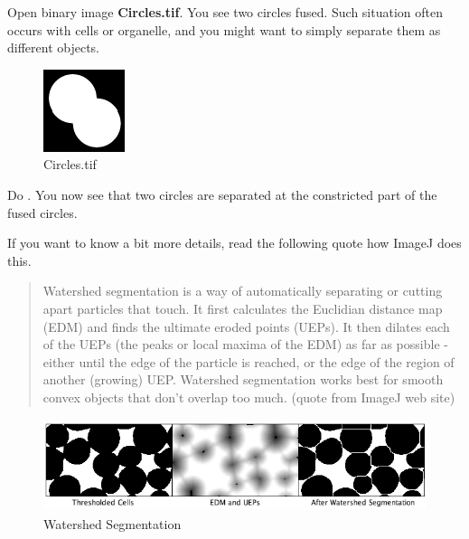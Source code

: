 \begin{indentexercise}{1}
Open binary image \textbf{Circles.tif}. You
see two circles fused. Such situation often occurs with cells or
organelle, and you might want to simply separate them as different
objects. 

\begin{figure}[htbp]
\begin{center}
\includegraphics[width=2.381cm,height=2.408cm]{img/CMCIBasicCourse201102-img116.png}
\caption{ Circles.tif}
\label{fig:img116}
\end{center}
\end{figure}

Do . You now see that two circles are separated at the
constricted part of the fused circles. 
\end{indentexercise}

If you want to know a bit more details, read the following quote how ImageJ does this.
\begin{quote}
Watershed segmentation is a way of automatically separating or cutting
apart particles that touch. It first calculates the Euclidian distance
map (EDM) and finds the ultimate eroded points (UEPs). It then dilates
each of the UEPs (the peaks or local maxima of the EDM) as far as
possible - either until the edge of the particle is reached, or the
edge of the region of another (growing) UEP. Watershed segmentation
works best for smooth convex objects that don't
overlap too much. (quote from ImageJ web site) 
\end{quote}
\begin{figure}[htbp]
\begin{center}
\includegraphics[width=13.418cm,height=2.701cm]{img/CMCIBasicCourse201102-img117.png}
\caption{ Watershed Segmentation}
\label{fig:img117}
\end{center}
\end{figure}

